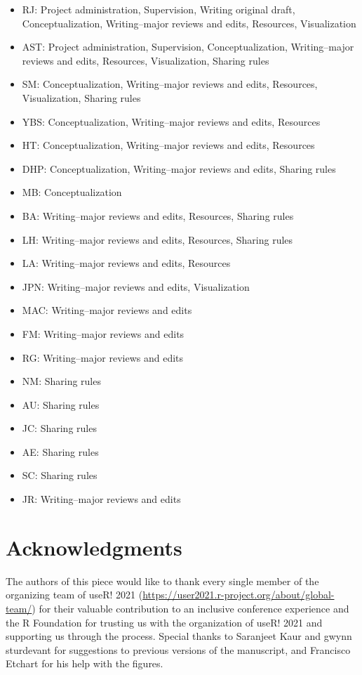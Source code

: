 \documentclass[10pt,letterpaper]{article}
\begin{document}
\begin{itemize}
    \item RJ: Project administration, Supervision, Writing original draft, Conceptualization, Writing--major reviews and edits, Resources, Visualization
    \item AST: Project administration, Supervision, Conceptualization,  Writing--major reviews and edits, Resources, Visualization, Sharing rules
    \item SM: Conceptualization, Writing--major reviews and edits, Resources, Visualization, Sharing rules
    \item YBS: Conceptualization, Writing--major reviews and edits, Resources
    \item HT: Conceptualization, Writing--major reviews and edits, Resources
    \item DHP: Conceptualization, Writing--major reviews and edits, Sharing rules
    \item MB: Conceptualization
    \item BA: Writing--major reviews and edits, Resources, Sharing rules
    \item LH: Writing--major reviews and edits, Resources, Sharing rules
    \item LA: Writing--major reviews and edits, Resources
    \item JPN: Writing--major reviews and edits, Visualization
    \item MAC: Writing--major reviews and edits
    \item FM: Writing--major reviews and edits
    \item RG: Writing--major reviews and edits
    \item NM: Sharing rules
    \item AU: Sharing rules
    \item JC: Sharing rules
    \item AE: Sharing rules
    \item SC: Sharing rules
    \item JR: Writing--major reviews and edits
\end{itemize}



\section*{Acknowledgments}
The authors of this piece would like to thank every single member of the organizing team of useR! 2021 (\url{https://user2021.r-project.org/about/global-team/}) for their valuable contribution to an inclusive conference experience and the R Foundation for trusting us with the organization of useR! 2021 and supporting us through the process. Special thanks to Saranjeet Kaur and gwynn sturdevant for suggestions to previous versions of the manuscript, and Francisco Etchart for his help with the figures.
\end{document}
